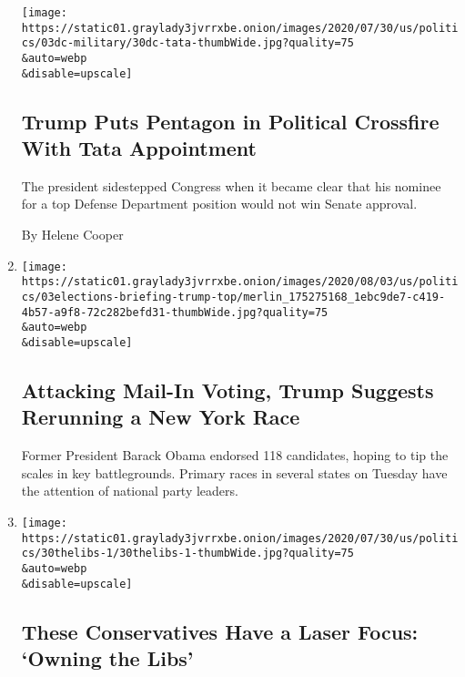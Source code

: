 \begin{enumerate}
  \texttt{[image: https://static01.graylady3jvrrxbe.onion/images/2020/07/30/us/politics/03dc-military/30dc-tata-thumbWide.jpg?quality=75\\\&auto=webp\\\&disable=upscale]}

  \hypertarget{trump-puts-pentagon-in-political-crossfire-with-tata-appointment}{%
  \subsection{Trump Puts Pentagon in Political Crossfire With Tata
  Appointment}\label{trump-puts-pentagon-in-political-crossfire-with-tata-appointment}}

  The president sidestepped Congress when it became clear that his
  nominee for a top Defense Department position would not win Senate
  approval.

  By Helene Cooper
\item
  \href{/2020/08/03/us/elections/biden-vs-trump.html}{}

  \texttt{[image: https://static01.graylady3jvrrxbe.onion/images/2020/08/03/us/politics/03elections-briefing-trump-top/merlin\_175275168\_1ebc9de7-c419-4b57-a9f8-72c282befd31-thumbWide.jpg?quality=75\\\&auto=webp\\\&disable=upscale]}

  \hypertarget{attacking-mail-in-voting-trump-suggests-rerunning-a-new-york-race}{%
  \subsection{Attacking Mail-In Voting, Trump Suggests Rerunning a New
  York
  Race}\label{attacking-mail-in-voting-trump-suggests-rerunning-a-new-york-race}}

  Former President Barack Obama endorsed 118 candidates, hoping to tip
  the scales in key battlegrounds. Primary races in several states on
  Tuesday have the attention of national party leaders.
\item
  \href{/2020/08/03/us/politics/the-federalist-trump-liberals.html}{}

  \texttt{[image: https://static01.graylady3jvrrxbe.onion/images/2020/07/30/us/politics/30thelibs-1/30thelibs-1-thumbWide.jpg?quality=75\\\&auto=webp\\\&disable=upscale]}

  \hypertarget{these-conservatives-have-a-laser-focus-owning-the-libs}{%
  \subsection{These Conservatives Have a Laser Focus: `Owning the
  Libs'}\label{these-conservatives-have-a-laser-focus-owning-the-libs}}


\end{enumerate}
